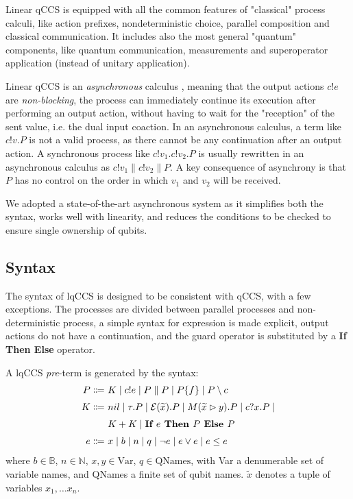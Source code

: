 Linear qCCS is equipped with all the common features of "classical" process calculi, like action prefixes, nondeterministic choice, parallel composition and classical communication. It includes also the most general "quantum" components, like quantum communication, measurements and superoperator application (instead of unitary application). 


Linear qCCS is an \textit{asynchronous} calculus  \cite{boudolAsynchronyPicalculus1992}, meaning that the output actions $c!e$ are \textit{non-blocking}, the process can immediately continue its execution after performing an output action, without having to wait for the "reception" of the sent value, i.e. the dual input coaction. In an asynchronous calculus, a term like $c!v.P$ is not a valid process, as there cannot be any continuation after an output action. A synchronous process like $c!v_1.c!v_2.P$ is usually rewritten in an asynchronous calculus as $c!v_1 \parallel c!v_2 \parallel P$. A key consequence of asynchrony is that $P$ has no control on the order in which $v_1$ and $v_2$ will be received.

We adopted a state-of-the-art asynchronous system as it simplifies both the syntax, works well with linearity, and reduces the conditions to be checked to ensure single ownership of qubits.

\subsection{Syntax}

The syntax of lqCCS is designed to be consistent with qCCS, with a few exceptions. The processes are divided between parallel processes and non-deterministic process, a simple syntax for expression is made explicit, output actions do not have a continuation, and the guard operator is substituted by a \textbf{If Then Else} operator.

A lqCCS \textit{pre}-term is generated by the syntax:
\begin{align*}
  P \Coloneqq &\ K \mid c!e \mid P \parallel P  \mid  P \{f\} \mid P \setminus c\\[0.1cm]
  K \Coloneqq &\ nil \mid \tau . P \mid \mathcal{E}(\widetilde{x}) . P \mid M(\widetilde{x} \rhd y) . P \mid c?x . P \mid \\[0.1cm]
  &\ K + K \mid \textbf{If }{e}\textbf{ Then } {P} \textbf{ Else } {P} \\[0.1cm]
  e \Coloneqq &\ x \mid b \mid n \mid q \mid \neg e \mid e \lor e \mid e \leq e
\end{align*}	
where $b \in \mathbb{B}$, $n \in \mathbb{N}$, $x, y \in \text{Var}$, $q \in \text{QNames}$, with Var a denumerable set of variable names, and QNames a finite set of qubit names. $\widetilde{x}$ denotes a tuple of variables $x_1, \ldots x_n$.


